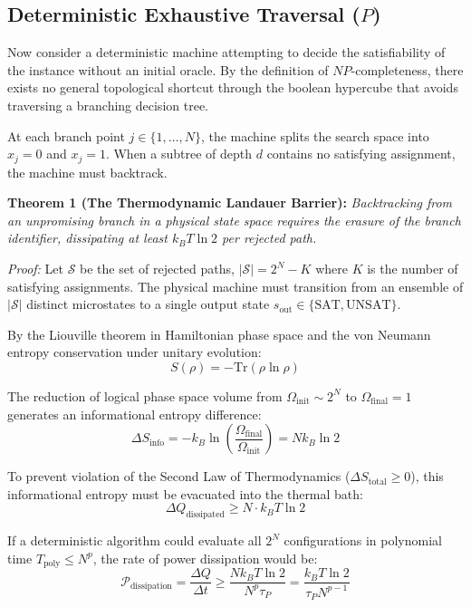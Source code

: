 \documentclass[10pt,twocolumn]{article}
\begin{document}
\subsection{Deterministic Exhaustive Traversal ($P$)}

Now consider a deterministic machine attempting to decide the satisfiability of the instance without an initial oracle. By the definition of $NP$-completeness, there exists no general topological shortcut through the boolean hypercube that avoids traversing a branching decision tree.

At each branch point $j \in \{1, \dots, N\}$, the machine splits the search space into $x_j = 0$ and $x_j = 1$. When a subtree of depth $d$ contains no satisfying assignment, the machine must backtrack. 

\textbf{Theorem 1 (The Thermodynamic Landauer Barrier):}  
\textit{Backtracking from an unpromising branch in a physical state space requires the erasure of the branch identifier, dissipating at least $k_B T \ln 2$ per rejected path.}

\textit{Proof:}  
Let $\mathcal{S}$ be the set of rejected paths, $|\mathcal{S}| = 2^N - K$ where $K$ is the number of satisfying assignments. The physical machine must transition from an ensemble of $|\mathcal{S}|$ distinct microstates to a single output state $s_{\text{out}} \in \{\text{SAT}, \text{UNSAT}\}$. 

By the Liouville theorem in Hamiltonian phase space and the von Neumann entropy conservation under unitary evolution:
\begin{equation}
  S(\rho) = -\text{Tr}(\rho \ln \rho)
\end{equation}

The reduction of logical phase space volume from $\Omega_{\text{init}} \sim 2^N$ to $\Omega_{\text{final}} = 1$ generates an informational entropy difference:
\begin{equation}
  \Delta S_{\text{info}} = -k_B \ln \left( \frac{\Omega_{\text{final}}}{\Omega_{\text{init}}} \right) = N k_B \ln 2
\end{equation}

To prevent violation of the Second Law of Thermodynamics ($\Delta S_{\text{total}} \ge 0$), this informational entropy must be evacuated into the thermal bath:
\begin{equation}
  \Delta Q_{\text{dissipated}} \ge N \cdot k_B T \ln 2
\end{equation}

If a deterministic algorithm could evaluate all $2^N$ configurations in polynomial time $T_{\text{poly}} \le N^p$, the rate of power dissipation would be:
\begin{equation}
  \mathcal{P}_{\text{dissipation}} = \frac{\Delta Q}{\Delta t} \ge \frac{N k_B T \ln 2}{N^p \tau_P} = \frac{k_B T \ln 2}{\tau_P N^{p-1}}
\end{equation}
\end{document}
